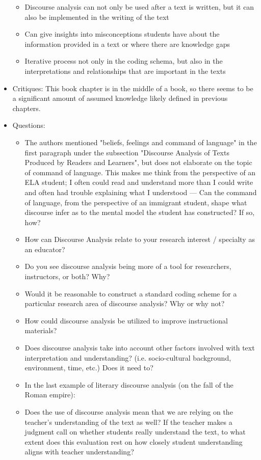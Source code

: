 \documentclass{TC}
\begin{document}
\begin{itemize}
\begin{itemize}
	\item Discourse analysis can not only be used after a text is written, but it can also be implemented in the writing of the text
	\item Can give insights into misconceptions students have about the information provided in a text or where there are knowledge gaps
	\item Iterative process not only in the coding schema, but also in the interpretations and relationships that are important in the texts
	\end{itemize}
\item Critiques: This book chapter is in the middle of a book, so there seems to be a significant amount of assumed knowledge likely defined in previous chapters.
\item Questions: 
	\begin{itemize}
	\item The authors mentioned "beliefs, feelings and command of language" in the first paragraph under the subsection "Discourse Analysis of Texts Produced by Readers and Learners", but does not elaborate on the topic of command of language. This makes me think from the perspective of an ELA student; I often could read and understand more than I could write and often had trouble explaining what I understood --- Can the command of language, from the perspective of an immigrant student, shape what discourse infer as to the mental model the student has constructed? If so, how?  
	\item How can Discourse Analysis relate to your research interest / specialty as an educator?
	\item Do you see discourse analysis being more of a tool for researchers, instructors, or both? Why?
	\item Would it be reasonable to construct a standard coding scheme for a particular research area of discourse analysis? Why or why not?
	\item How could discourse analysis be utilized to improve instructional materials?
	\item Does discourse analysis take into account other factors involved with text interpretation and understanding? (i.e. socio-cultural background, environment, time, etc.) Does it need to?
	\item In the last example of literary discourse analysis (on the fall of the Roman empire): 
	\item Does the use of discourse analysis mean that we are relying on the teacher's understanding of the text as well? If the teacher makes a judgment call on whether students really understand the text, to what extent does this evaluation rest on how closely student understanding aligns with teacher understanding? 
	
	\end{itemize}
\end{itemize}
\end{document}
